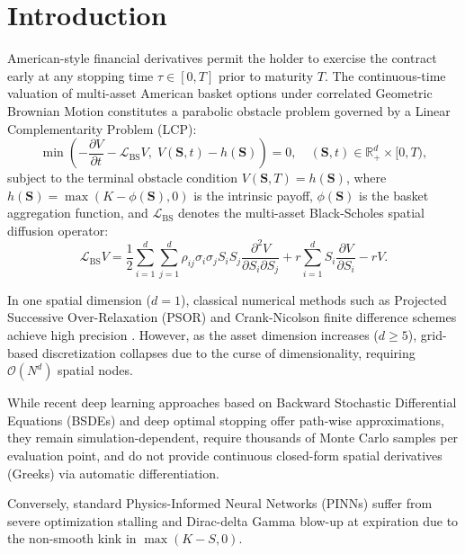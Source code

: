 \documentclass[11pt,a4paper]{article}
\begin{document}
\section{Introduction}
American-style financial derivatives permit the holder to exercise the contract early at any stopping time $\tau \in [0, T]$ prior to maturity $T$. The continuous-time valuation of multi-asset American basket options under correlated Geometric Brownian Motion constitutes a parabolic obstacle problem governed by a Linear Complementarity Problem (LCP):
\begin{equation}
\label{eq:lcp}
\min\left( -\frac{\partial V}{\partial t} - \mathcal{L}_{\text{BS}} V, \; V(\mathbf{S}, t) - h(\mathbf{S}) \right) = 0, \quad (\mathbf{S}, t) \in \mathbb{R}_+^d \times [0, T),
\end{equation}
subject to the terminal obstacle condition $V(\mathbf{S}, T) = h(\mathbf{S})$, where $h(\mathbf{S}) = \max\left( K - \phi(\mathbf{S}), 0 \right)$ is the intrinsic payoff, $\phi(\mathbf{S})$ is the basket aggregation function, and $\mathcal{L}_{\text{BS}}$ denotes the multi-asset Black-Scholes spatial diffusion operator:
\begin{equation}
\mathcal{L}_{\text{BS}} V = \frac{1}{2} \sum_{i=1}^d \sum_{j=1}^d \rho_{ij} \sigma_i \sigma_j S_i S_j \frac{\partial^2 V}{\partial S_i \partial S_j} + r \sum_{i=1}^d S_i \frac{\partial V}{\partial S_i} - r V.
\end{equation}

In one spatial dimension ($d=1$), classical numerical methods such as Projected Successive Over-Relaxation (PSOR) and Crank-Nicolson finite difference schemes achieve high precision \cite{cryer1971solution, brennan1977valuation}. However, as the asset dimension increases ($d \ge 5$), grid-based discretization collapses due to the curse of dimensionality, requiring $\mathcal{O}(N^d)$ spatial nodes. 

While recent deep learning approaches based on Backward Stochastic Differential Equations (BSDEs) and deep optimal stopping \cite{han2018solving, becker2019deep, becker2020solving} offer path-wise approximations, they remain simulation-dependent, require thousands of Monte Carlo samples per evaluation point, and do not provide continuous closed-form spatial derivatives (Greeks) via automatic differentiation. 

Conversely, standard Physics-Informed Neural Networks (PINNs) \cite{raissi2019physics, al2018solving} suffer from severe optimization stalling and Dirac-delta Gamma blow-up at expiration due to the non-smooth kink in $\max(K - S, 0)$.
\end{document}

